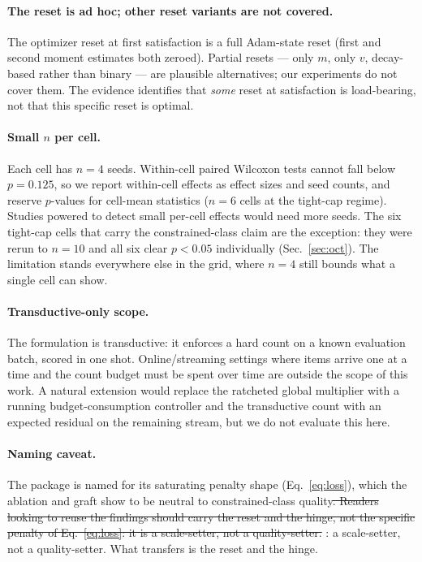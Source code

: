 \documentclass[10pt]{article}
\newcommand{\del}[1]{{\color{red}\sout{#1}}}
\begin{document}
\paragraph{The reset is ad hoc; other reset variants are not covered.}
The optimizer reset at first satisfaction is a full Adam-state reset
(first and second moment estimates both zeroed). Partial resets --- only
$m$, only $v$, decay-based rather than binary --- are plausible
alternatives; our experiments do not cover them. The evidence identifies
that \emph{some} reset at satisfaction is load-bearing, not that this
specific reset is optimal.

\paragraph{Small $n$ per cell.}
Each cell has $n{=}4$ seeds. Within-cell paired Wilcoxon tests cannot
fall below $p{=}0.125$, so we report within-cell effects as effect sizes
and seed counts, and reserve $p$-values for cell-mean statistics ($n{=}6$
cells at the tight-cap regime). Studies powered to detect small
per-cell effects would need more seeds.{\color{blue} The six tight-cap cells
that carry the constrained-class claim are the exception: they were rerun to
$n{=}10$ and all six clear $p<0.05$ individually
(Sec.~\ref{sec:oct}). The limitation stands everywhere else in the grid, where
$n{=}4$ still bounds what a single cell can show.}

\paragraph{Transductive-only scope.}
The formulation is transductive: it enforces a hard count on a known
evaluation batch, scored in one shot. Online/streaming settings where
items arrive one at a time and the count budget must be spent over time
are outside the scope of this work. A natural extension would replace
the ratcheted global multiplier with a running budget-consumption
controller and the transductive count with an expected residual on the
remaining stream, but we do not evaluate this here.

\paragraph{Naming caveat.}
The package is named for its saturating penalty shape
(Eq.~\eqref{eq:loss}), which the ablation and graft show to be neutral to
constrained-class quality\del{. Readers looking to reuse the
findings should carry the reset and the hinge, not the specific penalty
of Eq.~\eqref{eq:loss}: it is a scale-setter, not a quality-setter.}%
{\color{blue}: a scale-setter, not a quality-setter. What transfers is the
reset and the hinge.}
\end{document}
